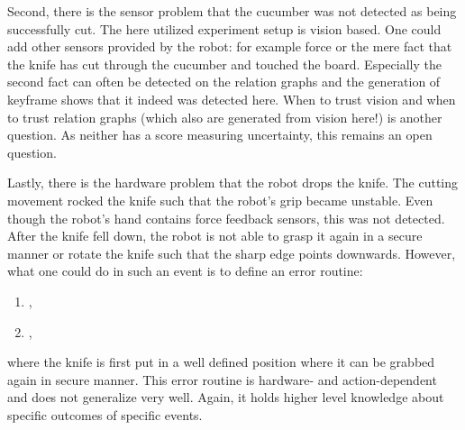 Second, there is the sensor problem that the cucumber was not detected as being successfully cut.
The here utilized experiment setup is vision based.
One could add other sensors provided by the robot: for example force or the mere fact that the knife has cut through the cucumber and touched the board.
Especially the second fact can often be detected on the relation graphs and the generation of keyframe  shows that it indeed was detected here.
When to trust vision and when to trust relation graphs (which also are generated from vision here!) is another question.
As neither has a score measuring uncertainty, this remains an open question.

Lastly, there is the hardware problem that the robot drops the knife.
The cutting movement rocked the knife such that the robot's grip became unstable.
Even though the robot's hand contains force feedback sensors, this was not detected.
After the knife fell down, the robot is not able to grasp it again in a secure manner or rotate the knife such that the sharp edge points downwards.
However, what one could do in such an event is to define an error routine:

\begin{enumerate}
  \item {},
  \item {},
\end{enumerate}

where the knife is first put in a well defined position where it can be grabbed again in secure manner.
This error routine is hardware- and action-dependent and does not generalize very well.
Again, it holds higher level knowledge about specific outcomes of specific events.

